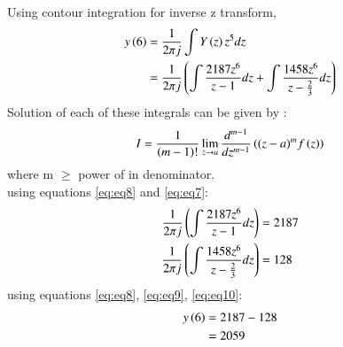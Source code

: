 \documentclass[journal,12pt,twocolumn]{IEEEtran}
\theoremstyle{remark}
\begin{document}
Using contour integration for inverse z transform,
\begin{align}
    y\left(6\right) &= \frac{1}{2\pi j}\int Y\left(z\right) z^{5} dz\\
    &= \frac{1}{2\pi j}\left(\int\frac{2187z^{6}}{z-1}dz + \int\frac{1458z^{6}}{z - \frac{2}{3}} dz\right) \label{eq:eq8}
\end{align}
Solution of each of these integrals can be given by :
\begin{align}
    I =\frac{1}{\left(m-1\right)!}\lim\limits_{z\to a}\frac{d^{m-1}}{dz^{m-1}}\left({(z-a)}^{m}f\left(z\right)\right) \label{eq:eq7}
\end{align}
where m $\geq$ power of   in denominator.\\
using equations \eqref{eq:eq8} and \eqref{eq:eq7}:
\begin{align}
    \frac{1}{2\pi j}\left(\int\frac{2187z^{6}}{z - 1}dz\right) &= 2187\label{eq:eq9}\\
     \frac{1}{2\pi j}\left(\int\frac{1458z^{6}}{z - \frac{2}{3}}dz\right)  &= 128\label{eq:eq10}
     \end{align}
using equations \eqref{eq:eq8}, \eqref{eq:eq9}, \eqref{eq:eq10}:
\begin{align}
y\left(6\right) &= 2187 - 128\\
&= 2059
\end{align}
\end{document}
